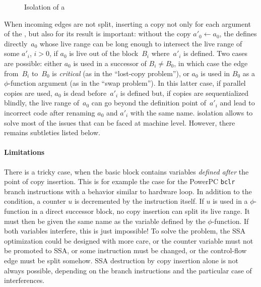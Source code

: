 \begin{figure}[h]
  \hfill
{}\hfill
{}
\hfill\strut
\caption{Isolation of a \phinode\label{fig:phi_isolation}}
\end{figure}


When incoming edges are not split, inserting a copy not only for each argument of the \phifun, but also for its result is important: 
without the copy $a'_0\gets a_0$, the \phifun defines directly~$a_0$ whose live range can be long enough to intersect the live range of some $a'_i$, $i>0$, if $a_0$ is live out of the block~$B_i$ where~$a'_i$ is defined. 
Two cases are possible: 
either $a_0$ is used in a successor of $B_i \neq B_0$, in which case the edge from~$B_i$ to~$B_0$ is \emph{critical} (as in the ``lost-copy problem''), or $a_0$ is used in $B_0$ as a $\phi$-function argument (as in the ``swap problem''). 
In this latter case, if parallel copies are used, $a_0$ is dead before~$a'_i$ is defined but, if copies are sequentialized blindly, the live range of~$a_0$ can go beyond the definition point of~$a'_i$ and lead to incorrect code after renaming $a_0$ and $a'_i$ with the same name. 
\phinode isolation allows to solve most of the issues that can be faced at machine level. 
However, there remains subtleties listed below.



\paragraph{Limitations}
There is a tricky case, when the basic block contains variables \emph{defined after} the point of copy insertion. 
This is for example the case for the PowerPC \texttt{bclr} branch instructions with a behavior similar to hardware loop. 
In addition to the condition, a counter $u$ is decremented by the instruction itself. 
If $u$ is used in a $\phi$-function in a direct successor block, no copy insertion can split its live range. 
It must then be given the same name as the variable defined by the $\phi$-function. 
If both variables interfere, this is just impossible! 
To solve the problem, the SSA optimization could be designed with more care, or the counter variable must not be promoted to SSA, or some instruction must be changed, or the control-flow edge must be split somehow. 
SSA destruction by copy insertion alone is not always possible, depending on the branch instructions and the particular case of interferences.

